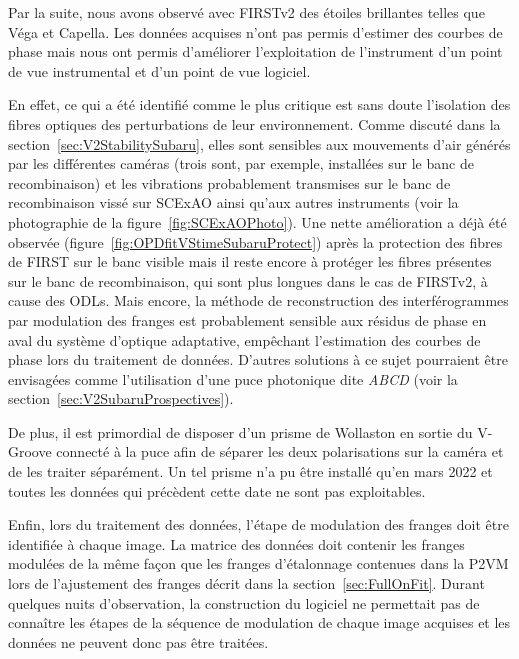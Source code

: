 Par la suite, nous avons observé avec \ac{FIRSTv2} des étoiles brillantes telles que Véga et Capella. Les données acquises n'ont pas permis d'estimer des courbes de phase mais nous ont permis d'améliorer l'exploitation de l'instrument d'un point de vue instrumental et d'un point de vue logiciel. 

En effet, ce qui a été identifié comme le plus critique est sans doute l'isolation des fibres optiques des perturbations de leur environnement. Comme discuté dans la section~\ref{sec:V2StabilitySubaru}, elles sont sensibles aux mouvements d'air générés par les différentes caméras (trois sont, par exemple, installées sur le banc de recombinaison) et les vibrations probablement transmises sur le banc de recombinaison vissé sur \ac{SCExAO} ainsi qu'aux autres instruments (voir la photographie de la figure~\ref{fig:SCExAOPhoto}). Une nette amélioration a déjà été observée (figure~\ref{fig:OPDfitVStimeSubaruProtect}) après la protection des fibres de \ac{FIRST} sur le banc visible mais il reste encore à protéger les fibres présentes sur le banc de recombinaison, qui sont plus longues dans le cas de \ac{FIRSTv2}, à cause des \ac{ODL}s. Mais encore, la méthode de reconstruction des interférogrammes par modulation des franges est probablement sensible aux résidus de phase en aval du système d'optique adaptative, empêchant l'estimation des courbes de phase lors du traitement de données. D'autres solutions à ce sujet pourraient être envisagées comme l'utilisation d'une puce photonique dite \textit{ABCD} (voir la section~\ref{sec:V2SubaruProspectives}).

De plus, il est primordial de disposer d'un prisme de Wollaston en sortie du V-Groove connecté à la puce afin de séparer les deux polarisations sur la caméra et de les traiter séparément. Un tel prisme n'a pu être installé qu'en mars 2022 et toutes les données qui précèdent cette date ne sont pas exploitables.

Enfin, lors du traitement des données, l'étape de modulation des franges doit être identifiée à chaque image. La matrice des données doit contenir les franges modulées de la même façon que les franges d'étalonnage contenues dans la \ac{P2VM} lors de l'ajustement des franges décrit dans la section~\ref{sec:FullOnFit}. Durant quelques nuits d'observation, la construction du logiciel ne permettait pas de connaître les étapes de la séquence de modulation de chaque image acquises et les données ne peuvent donc pas être traitées.


